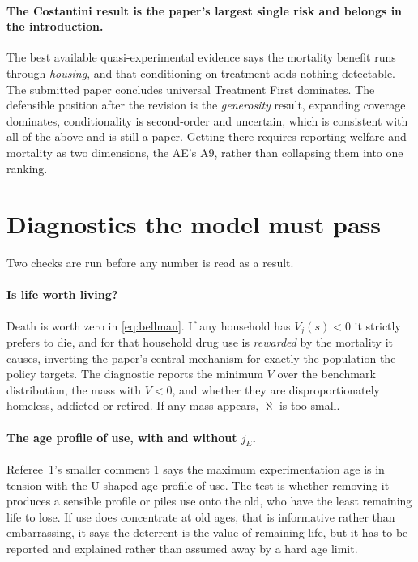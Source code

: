 \documentclass[11pt]{article}
\begin{document}
\paragraph{The Costantini result is the paper's largest single risk and belongs
in the introduction.} The best available quasi-experimental evidence says the
mortality benefit runs through \emph{housing}, and that conditioning on treatment
adds nothing detectable. The submitted paper concludes universal Treatment First
dominates. The defensible position after the revision is the \emph{generosity}
result, expanding coverage dominates, conditionality is second-order and
uncertain, which is consistent with all of the above and is still a paper.
Getting there requires reporting welfare and mortality as two dimensions, the
AE's A9, rather than collapsing them into one ranking.

\section{Diagnostics the model must pass}
\label{sec:diag}

Two checks are run before any number is read as a result.

\paragraph{Is life worth living?} Death is worth zero in \eqref{eq:bellman}. If
any household has $V_j(s)<0$ it strictly prefers to die, and for that household
drug use is \emph{rewarded} by the mortality it causes, inverting the paper's
central mechanism for exactly the population the policy targets. The diagnostic
reports the minimum $V$ over the benchmark distribution, the mass with $V<0$, and
whether they are disproportionately homeless, addicted or retired. If any mass
appears, $\aleph$ is too small.

\paragraph{The age profile of use, with and without $j_E$.} Referee~1's smaller
comment 1 says the maximum experimentation age is in tension with the U-shaped
age profile of use. The test is whether removing it produces a sensible profile
or piles use onto the old, who have the least remaining life to lose. If use does
concentrate at old ages, that is informative rather than embarrassing, it says
the deterrent is the value of remaining life, but it has to be reported and
explained rather than assumed away by a hard age limit.
\end{document}
